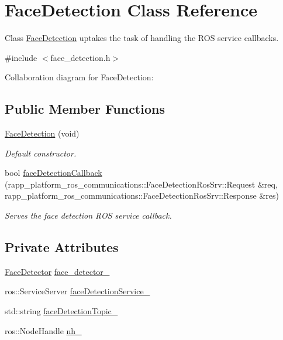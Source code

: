 \hypertarget{classFaceDetection}{\section{Face\-Detection Class Reference}
\label{classFaceDetection}
}


Class \hyperlink{classFaceDetection}{Face\-Detection} uptakes the task of handling the R\-O\-S service callbacks.  




{\ttfamily \#include $<$face\-\_\-detection.\-h$>$}



Collaboration diagram for Face\-Detection\-:
\subsection*{Public Member Functions}
\begin{DoxyCompactItemize}
\item 
\hyperlink{classFaceDetection_ae047cd60fcdc6a2b0fbfd06410c38529}{Face\-Detection} (void)
\begin{DoxyCompactList}\small\item\em Default constructor. \end{DoxyCompactList}\item 
bool \hyperlink{classFaceDetection_a72f1e1890fcf06eae61016ad42506314}{face\-Detection\-Callback} (rapp\-\_\-platform\-\_\-ros\-\_\-communications\-::\-Face\-Detection\-Ros\-Srv\-::\-Request \&req, rapp\-\_\-platform\-\_\-ros\-\_\-communications\-::\-Face\-Detection\-Ros\-Srv\-::\-Response \&res)
\begin{DoxyCompactList}\small\item\em Serves the face detection R\-O\-S service callback. \end{DoxyCompactList}\end{DoxyCompactItemize}
\subsection*{Private Attributes}
\begin{DoxyCompactItemize}
\item 
\hyperlink{classFaceDetector}{Face\-Detector} \hyperlink{classFaceDetection_a74003a22de1b6d9b1140f3e2c1a6444c}{face\-\_\-detector\-\_\-}
\item 
ros\-::\-Service\-Server \hyperlink{classFaceDetection_a72874127ac52787483a3f1a744771eb7}{face\-Detection\-Service\-\_\-}
\item 
std\-::string \hyperlink{classFaceDetection_a579ac45aa616167d12e25b7657c05af1}{face\-Detection\-Topic\-\_\-}
\item 
ros\-::\-Node\-Handle \hyperlink{classFaceDetection_a72f7ce4daf0768075f88c48db5957195}{nh\-\_\-}
\end{DoxyCompactItemize}


